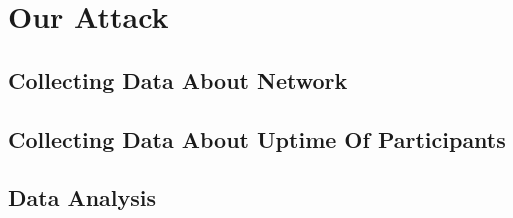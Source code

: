 \chapter{Our Attack}
\label{chap:our_attack}

\section{Collecting Data About Network}
\label{sec:get_network_data}

\section{Collecting Data About Uptime Of Participants}
\label{sec:get_patricipant_data}

\section{Data Analysis}
\label{sec:data_analysis}

